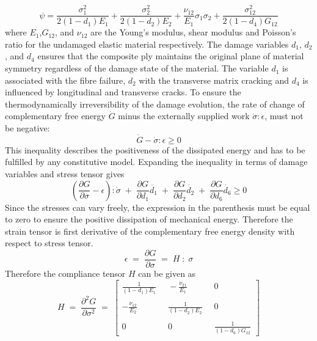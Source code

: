 \documentclass[a4paper,12pt]{article}
\begin{document}
\begin{equation}
\psi = \frac{\sigma_{1}^{2}}{2(1 - d_{1})E_{1}} + \frac{\sigma_{2}^{2}}{2(1 - d_{2})E_{2}}  +  \frac{\nu_{12}}{E_{1}}\sigma_{1}\sigma_{2}  +  \frac{\sigma_{12}^{2}}{2(1 - d_{4})G_{12}} 
\end{equation}
where $E_{1}$,$G_{12}$, and $\nu_{12}$  are the Young's modulus, shear modulus and Poisson's ratio for the undamaged elastic material respectively. The damage variables $d_{1}$, $d_{2}$, and $d_{4}$ ensures that the composite ply maintains the original plane of material symmetry regardless of the damage state of the material. The variable $d_{1}$ is associated with the fibre failure, $d_{2}$  with the transverse matrix cracking and $d_{4}$ is influenced by longitudinal and transverse cracks. To ensure the thermodynamically irreversibility of the damage evolution, the rate of change of complementary free energy $\dot{G}$ minus the externally supplied work $\dot{\sigma}:\epsilon$, must not be negative:
\begin{equation}
\dot{G} - \dot{\sigma}:\epsilon  \geq 0
\end{equation}
This inequality describes the positiveness of the dissipated energy and has to be fulfilled by any constitutive model. Expanding the inequality in terms of damage variables and stress tensor gives
\begin{equation}
(\frac{\partial G}{\partial \sigma} - \epsilon) : \dot{\sigma} \; + \;\frac{\partial G}{\partial d_{1}}\dot{d_{1}}\; +\; \frac{\partial G}{\partial d_{2}}\dot{d_{2}}\; +\; \frac{\partial G}{\partial d_{6}}\dot{d_{6}}  \geq  0
\end{equation}
Since the stresses can vary freely, the expression in the parenthesis must be equal to zero to ensure the positive dissipation of mechanical energy. Therefore the strain tensor is first derivative of the complementary free energy density with respect to stress tensor.
\begin{equation}
\epsilon \; = \; \frac{\partial G}{\partial \sigma}  \; = \; H\;:\;\sigma
\end{equation}
Therefore the compliance tensor $H$ can be given as
$$
H \;=\;  \frac{\partial^{2} G}{\partial \sigma^{2}}\; =\;
 \begin{bmatrix}
  \frac{1}{(1 - d_{1})E_{1}}\; &\; -\frac{\nu_{21}}{E_{1}}\; &\; 0  \\
  \\
   -\frac{\nu_{12}}{E_{2}}\; &\; \frac{1}{(1 - d_{2})E_{2}}\; & \; 0  \\
   \\
  0\; &\; 0\; &\; \frac{1}{(1 - d_{6})G_{12}} 
 
 \end{bmatrix}
 $$
\end{document}

